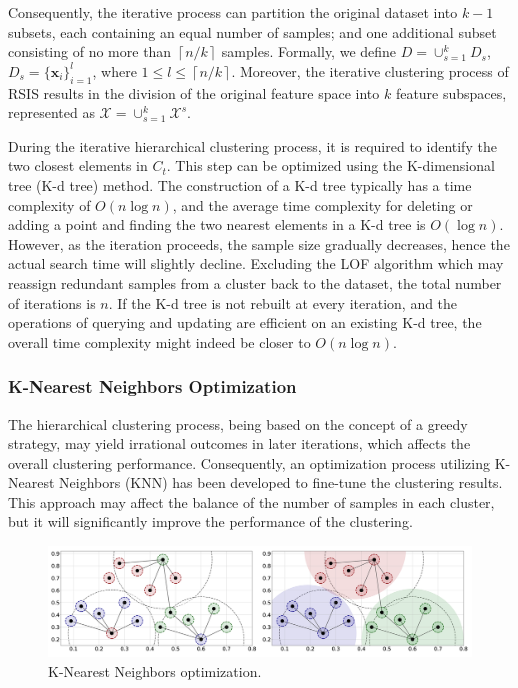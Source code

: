 \documentclass[final,3p,times]{elsarticle}
\begin{document}
Consequently, the iterative process can partition the original 
dataset into $k-1$ subsets, each containing an equal number 
of samples; and one additional subset consisting of no more 
than $\left\lceil n/k\right\rceil$ samples. Formally, we 
define $D={\cup}^k_{s=1}D_s$, $D_s=\{\boldsymbol{x}_i\}_{i=1}^l$, 
where $1 {\le} l {\le} \left\lceil n/k\right\rceil$. Moreover, the 
iterative clustering process of RSIS results in the division of 
the original feature space into $k$ feature subspaces, represented 
as $\mathcal{X} = \cup_{s=1}^{k} \mathcal{X}^s$.

During the iterative hierarchical clustering process, it is 
required to identify the two closest elements in $C_t$. This step 
can be optimized using the K-dimensional tree (K-d tree) method. 
The construction of a K-d tree typically has a time complexity 
of $O(n\log{n})$, and the average time complexity for deleting or 
adding a point and finding the two nearest elements in a K-d 
tree is $O(\log{n})$. However, as the iteration proceeds, the 
sample size gradually decreases, hence the actual search time 
will slightly decline. Excluding the LOF algorithm which may 
reassign redundant samples from a cluster back to the dataset, 
the total number of iterations is $n$. If the K-d tree is not 
rebuilt at every iteration, and the operations of querying and 
updating are efficient on an existing K-d tree, the overall 
time complexity might indeed be closer to $O(n\log{n})$.





\subsubsection{K-Nearest Neighbors Optimization}
The hierarchical clustering process, being based on the concept 
of a greedy strategy, may yield irrational outcomes in later 
iterations, which affects the overall clustering performance. 
Consequently, an optimization process utilizing K-Nearest 
Neighbors (KNN) has been developed to fine-tune the clustering 
results. This approach may affect the balance of the number of 
samples in each cluster, but it will significantly improve the 
performance of the clustering.

\begin{figure}[t!]
  \centering
  \includegraphics[scale=0.3]{Fig3.png}
  \caption{K-Nearest Neighbors optimization.}
  \label{Fig3}
\end{figure}
\end{document}
